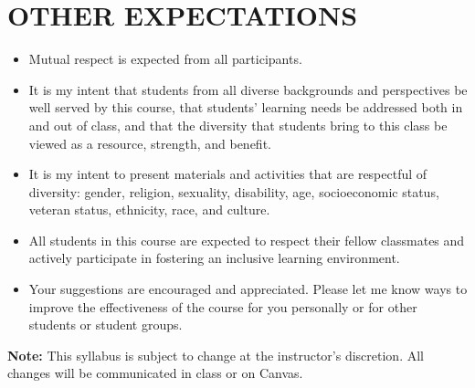 \documentclass[12pt]{article}
\begin{document}
\section*{OTHER EXPECTATIONS}
\begin{itemize}
    \item Mutual respect is expected from all participants.

    \item It is my intent that students from all diverse backgrounds and perspectives be well served by this course, that students’ learning needs be addressed both in and out of class, and that the diversity that students bring to this class be viewed as a resource, strength, and benefit.
    \item It is my intent to present materials and activities that are respectful of diversity: gender, religion, sexuality, disability, age, socioeconomic status, veteran status, ethnicity, race, and culture.
    \item All students in this course are expected to respect their fellow classmates and actively participate in fostering an inclusive learning environment.
    \item Your suggestions are encouraged and appreciated. Please let me know ways to improve the
    effectiveness of the course for you personally or for other students or student groups.
  
\end{itemize}
\vspace{1em}
\noindent
\textbf{Note:} This syllabus is subject to change at the instructor’s discretion. All changes will be communicated in class or on Canvas.
\end{document}
